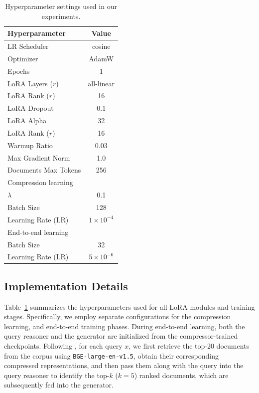 \documentclass{applemlr}
\numberwithin{equation}{section}
\begin{document}
\begin{table}[H]
\centering
\small
\begin{tabular}{lc}
\toprule
\textbf{Hyperparameter} & \textbf{Value} \\
\midrule
LR Scheduler & cosine \\
Optimizer & AdamW \\
Epochs & 1 \\
LoRA Layers ($r$) & all-linear \\
LoRA Rank ($r$) & 16 \\
LoRA Dropout & 0.1 \\
LoRA Alpha & 32 \\
LoRA Rank ($r$) & 16 \\
Warmup Ratio & 0.03 \\
Max Gradient Norm & 1.0 \\
Documents Max Tokens & 256 \\
\rowcolor{gray!30} Compression learning & \\ 
$\lambda$  & 0.1 \\
Batch Size & 128 \\
Learning Rate (LR) & $1 \times 10^{-4}$ \\
\rowcolor{gray!30} End-to-end learning & \\ 
Batch Size & 32 \\
Learning Rate (LR) & $5 \times 10^{-6}$ \\
\bottomrule
\end{tabular}
\caption{\centering Hyperparameter settings used in our experiments.}
\label{tab:hyperparams}
\end{table}

\subsection{Implementation Details}
Table~\ref{tab:hyperparams} summarizes the hyperparameters used for all LoRA modules and training stages. 
Specifically, we employ separate configurations for the compression learning, and end-to-end training phases.
During end-to-end learning, both the query reasoner and the generator are initialized from the compressor-trained checkpoints. 
Following \cite{shi2025directretrievalaugmentedoptimizationsynergizing}, for each query $x$, we first retrieve the top-20 documents from the corpus using \texttt{BGE-large-en-v1.5}, obtain their corresponding compressed representations, and then pass them along with the query into the query reasoner to identify the top-$k$ ($k=5$) ranked documents, which are subsequently fed into the generator.
\end{document}
